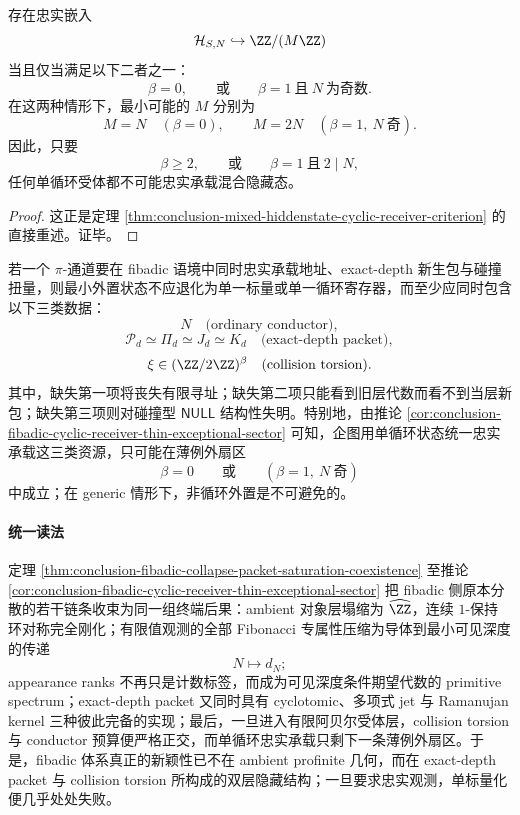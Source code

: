 \begin{corollary}[单循环受体只存在于薄例外扇区]\label{cor:conclusion-fibadic-cyclic-receiver-thin-exceptional-sector}
存在忠实嵌入
\[
\mathcal H_{S,N}\hookrightarrow \ZZ/(M\ZZ)
\]
当且仅当满足以下二者之一：
\[
\beta=0,
\qquad\text{或}\qquad
\beta=1\ \text{且}\ N\ \text{为奇数}.
\]
在这两种情形下，最小可能的 \(M\) 分别为
\[
M=N
\quad (\beta=0),
\qquad
M=2N
\quad (\beta=1,\ N\ \text{奇}).
\]
因此，只要
\[
\beta\ge 2,
\qquad\text{或}\qquad
\beta=1\ \text{且}\ 2\mid N,
\]
任何单循环受体都不可能忠实承载混合隐藏态。
\end{corollary}
\begin{proof}
这正是定理
\ref{thm:conclusion-mixed-hiddenstate-cyclic-receiver-criterion}
的直接重述。证毕。
\end{proof}

\begin{conjecture}\label{conj:conclusion-fibadic-pi-channel-three-register-principle}
若一个 \(\pi\)-通道要在 fibadic 语境中同时忠实承载地址、exact-depth 新生包与碰撞扭量，则最小外置状态不应退化为单一标量或单一循环寄存器，而至少应同时包含以下三类数据：
\[
N
\quad\text{(ordinary conductor)},
\]
\[
\mathcal P_d
\simeq
\Pi_d
\simeq
J_d
\simeq
K_d
\quad\text{(exact-depth packet)},
\]
\[
\xi\in (\ZZ/2\ZZ)^\beta
\quad\text{(collision torsion)}.
\]
其中，缺失第一项将丧失有限寻址；缺失第二项只能看到旧层代数而看不到当层新包；缺失第三项则对碰撞型 \(\mathsf{NULL}\) 结构性失明。特别地，由推论
\ref{cor:conclusion-fibadic-cyclic-receiver-thin-exceptional-sector}
可知，企图用单循环状态统一忠实承载这三类资源，只可能在薄例外扇区
\[
\beta=0
\qquad\text{或}\qquad
(\beta=1,\ N\ \text{奇})
\]
中成立；在 generic 情形下，非循环外置是不可避免的。
\end{conjecture}

\paragraph{统一读法}
定理 \ref{thm:conclusion-fibadic-collapse-packet-saturation-coexistence} 至推论
\ref{cor:conclusion-fibadic-cyclic-receiver-thin-exceptional-sector}
把 fibadic 侧原本分散的若干链条收束为同一组终端后果：ambient 对象层塌缩为
\(\widehat{\ZZ}\)，连续 \(1\)-保持环对称完全刚化；有限值观测的全部 Fibonacci 专属性压缩为导体到最小可见深度的传递
\[
N\longmapsto d_N;
\]
appearance ranks 不再只是计数标签，而成为可见深度条件期望代数的 primitive spectrum；exact-depth packet 又同时具有 cyclotomic、多项式 jet 与 Ramanujan kernel 三种彼此完备的实现；最后，一旦进入有限阿贝尔受体层，collision torsion 与 conductor 预算便严格正交，而单循环忠实承载只剩下一条薄例外扇区。于是，fibadic 体系真正的新颖性已不在 ambient profinite 几何，而在 exact-depth packet 与 collision torsion 所构成的双层隐藏结构；一旦要求忠实观测，单标量化便几乎处处失败。

\endinput
